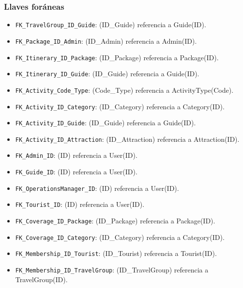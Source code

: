 \documentclass[11pt,a4paper]{article}
\begin{document}
\subsubsection*{Llaves foráneas}
\begin{itemize}[leftmargin=1.2em,itemsep=2pt,topsep=3pt]
\item \texttt{FK\_\allowbreak{}TravelGroup\_\allowbreak{}ID\_\allowbreak{}Guide}: (ID\_Guide) referencia a Guide(ID).
\item \texttt{FK\_\allowbreak{}Package\_\allowbreak{}ID\_\allowbreak{}Admin}: (ID\_Admin) referencia a Admin(ID).
\item \texttt{FK\_\allowbreak{}Itinerary\_\allowbreak{}ID\_\allowbreak{}Package}: (ID\_Package) referencia a Package(ID).
\item \texttt{FK\_\allowbreak{}Itinerary\_\allowbreak{}ID\_\allowbreak{}Guide}: (ID\_Guide) referencia a Guide(ID).
\item \texttt{FK\_\allowbreak{}Activity\_\allowbreak{}Code\_\allowbreak{}Type}: (Code\_Type) referencia a ActivityType(Code).
\item \texttt{FK\_\allowbreak{}Activity\_\allowbreak{}ID\_\allowbreak{}Category}: (ID\_Category) referencia a Category(ID).
\item \texttt{FK\_\allowbreak{}Activity\_\allowbreak{}ID\_\allowbreak{}Guide}: (ID\_Guide) referencia a Guide(ID).
\item \texttt{FK\_\allowbreak{}Activity\_\allowbreak{}ID\_\allowbreak{}Attraction}: (ID\_Attraction) referencia a Attraction(ID).
\item \texttt{FK\_\allowbreak{}Admin\_\allowbreak{}ID}: (ID) referencia a User(ID).
\item \texttt{FK\_\allowbreak{}Guide\_\allowbreak{}ID}: (ID) referencia a User(ID).
\item \texttt{FK\_\allowbreak{}OperationsManager\_\allowbreak{}ID}: (ID) referencia a User(ID).
\item \texttt{FK\_\allowbreak{}Tourist\_\allowbreak{}ID}: (ID) referencia a User(ID).
\item \texttt{FK\_\allowbreak{}Coverage\_\allowbreak{}ID\_\allowbreak{}Package}: (ID\_Package) referencia a Package(ID).
\item \texttt{FK\_\allowbreak{}Coverage\_\allowbreak{}ID\_\allowbreak{}Category}: (ID\_Category) referencia a Category(ID).
\item \texttt{FK\_\allowbreak{}Membership\_\allowbreak{}ID\_\allowbreak{}Tourist}: (ID\_Tourist) referencia a Tourist(ID).
\item \texttt{FK\_\allowbreak{}Membership\_\allowbreak{}ID\_\allowbreak{}TravelGroup}: (ID\_TravelGroup) referencia a TravelGroup(ID).

\end{itemize}
\end{document}
